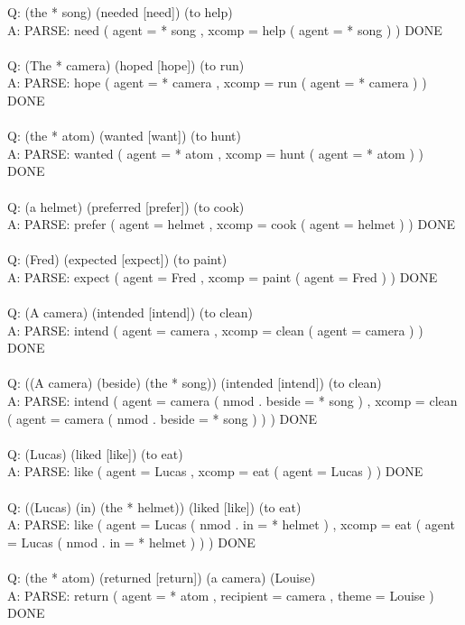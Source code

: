 \documentclass{article} \usepackage{iclr2022_conference,times}
\newcommand{\prompt}[1]{{\footnotesize \textsf{#1}}}
\begin{document}
\prompt{Q: (the * song) (needed [need]) (to help) \\
A: PARSE: need ( agent = * song , xcomp = help ( agent = * song ) ) DONE \\
 \\
Q: (The * camera) (hoped [hope]) (to run) \\
A: PARSE: hope ( agent = * camera , xcomp = run ( agent = * camera ) ) DONE \\
 \\
Q: (the * atom) (wanted [want]) (to hunt) \\
A: PARSE: wanted ( agent = * atom , xcomp = hunt ( agent = * atom ) ) DONE \\
 \\
Q: (a helmet) (preferred [prefer]) (to cook) \\
A: PARSE: prefer ( agent = helmet , xcomp = cook ( agent = helmet ) ) DONE \\
 \\
Q: (Fred) (expected [expect]) (to paint)  \\
A: PARSE: expect ( agent = Fred , xcomp = paint ( agent = Fred ) ) DONE \\
 \\
Q: (A camera) (intended [intend]) (to clean) \\
A: PARSE: intend ( agent = camera , xcomp = clean ( agent = camera ) ) DONE \\
 \\
Q: ((A camera) (beside) (the * song)) (intended [intend]) (to clean) \\
A: PARSE: intend ( agent = camera ( nmod . beside = * song ) , xcomp = clean ( agent = camera ( nmod . beside = * song ) ) ) DONE \\
 \\
Q: (Lucas) (liked [like]) (to eat) \\
A: PARSE: like ( agent = Lucas , xcomp = eat ( agent = Lucas ) ) DONE \\
 \\
Q: ((Lucas) (in) (the * helmet)) (liked [like]) (to eat) \\
A: PARSE: like ( agent = Lucas ( nmod . in = * helmet ) , xcomp = eat ( agent = Lucas ( nmod . in = * helmet ) ) ) DONE \\
 \\
Q: (the * atom) (returned [return]) (a camera) (Louise) \\
A: PARSE: return ( agent = * atom , recipient = camera , theme = Louise ) DONE \\
 \\
}
\end{document}
